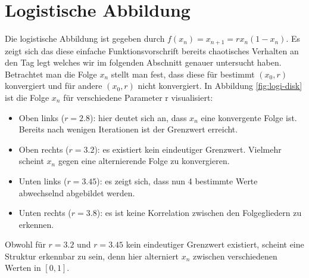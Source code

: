 \documentclass[12pt,a4paper]{article}
\begin{document}
\section{Logistische Abbildung}
Die logistische Abbildung ist gegeben durch $f(x_n)=x_{n+1}=rx_n(1-x_n)$. Es zeigt sich das diese einfache Funktionsvorschrift 
bereits chaotisches Verhalten an den Tag legt welches wir im folgenden Abschnitt genauer untersucht haben.
\newline
Betrachtet man die Folge $x_n$ stellt man fest, dass diese für bestimmt $(x_0, r)$ konvergiert und für andere $(x_0, r)$ nicht konvergiert. In Abbildung \ref{fig:logi-disk} ist die Folge $x_n$ für verschiedene Parameter r visualisiert: 
\begin{itemize}
\item Oben links ($r=2.8$): hier deutet sich an, dass $x_n$ eine konvergente Folge ist. Bereits 
nach wenigen Iterationen ist der Grenzwert erreicht. 
\item Oben rechts ($r=3.2$): es existiert kein eindeutiger Grenzwert. Vielmehr scheint $x_n$ gegen eine alternierende Folge zu konvergieren.
\item Unten links ($r=3.45$): es zeigt sich, dass nun 4 bestimmte Werte abwechselnd abgebildet werden.
\item Unten rechts ($r=3.8$): es ist keine Korrelation zwischen den Folgegliedern zu erkennen.
\end{itemize}
Obwohl für $r=3.2$ und $r=3.45$ kein eindeutiger Grenzwert existiert, scheint eine Struktur erkennbar zu sein, denn hier alterniert $x_n$ zwischen verschiedenen Werten in $[0,1]$. 
\end{document}
